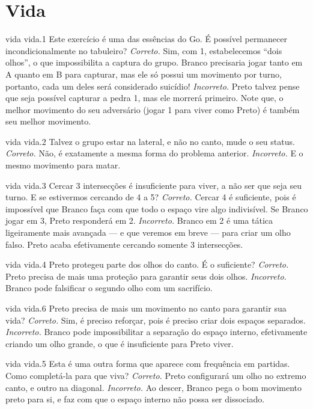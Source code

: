 \chapter{Vida}

\emptypage

\problemAnswerDiagram
  {vida}
  {vida.1}
  {Este exercício é uma das essências do Go. É possível permanecer incondicionalmente no tabuleiro?}
  {\emph{Correto.} Sim, com 1, estabelecemos ``dois olhos'', o que impossibilita a captura do grupo. Branco precisaria jogar tanto em A quanto em B para capturar, mas ele só possui um movimento por turno, portanto, cada um deles será considerado suicídio!}
  {\emph{Incorreto.} Preto talvez pense que seja possível capturar a pedra 1, mas ele morrerá primeiro. Note que, o melhor movimento do seu adversário (jogar 1 para viver como Preto) é também seu melhor movimento.}

\problemAnswerDiagram
  {vida}
  {vida.2}
  {Talvez o grupo estar na lateral, e não no canto, mude o seu status.}
  {\emph{Correto.} Não, é exatamente a mesma forma do problema anterior.}
  {\emph{Incorreto.} E o mesmo movimento para matar.}

\problemAnswerDiagram
  {vida}
  {vida.3}
  {Cercar 3 intersecções é insuficiente para viver, a não ser que seja seu turno. E se estivermos cercando de 4 a 5?}
  {\emph{Correto.} Cercar 4 é suficiente, pois é impossível que Branco faça com que todo o espaço vire algo indivisível. Se Branco jogar em 3, Preto responderá em 2.}
  {\emph{Incorreto.} Branco em 2 é uma tática ligeiramente mais avançada --- e que veremos em breve --- para criar um olho falso. Preto acaba efetivamente cercando somente 3 intersecções.}

\problemAnswerDiagram
  {vida}
  {vida.4}
  {Preto protegeu parte dos olhos do canto. É o suficiente?}
  {\emph{Correto.} Preto precisa de mais uma proteção para garantir seus dois olhos.}
  {\emph{Incorreto.} Branco pode falsificar o segundo olho com um sacrifício.}

\problemAnswerDiagram
  {vida}
  {vida.6}
  {Preto precisa de mais um movimento no canto para garantir sua vida?}
  {\emph{Correto.} Sim, é preciso reforçar, pois é preciso criar dois espaços separados.}
  {\emph{Incorreto.} Branco pode impossibilitar a separação do espaço interno, efetivamente criando um olho grande, o que é insuficiente para Preto viver.}

\problemAnswerDiagram
  {vida}
  {vida.5}
  {Esta é uma outra forma que aparece com frequência em partidas. Como completá-la para que viva?}
  {\emph{Correto.} Preto configurará um olho no extremo canto, e outro na diagonal.}
  {\emph{Incorreto.} Ao descer, Branco pega o bom movimento preto para si, e faz com que o espaço interno não possa ser dissociado.}
